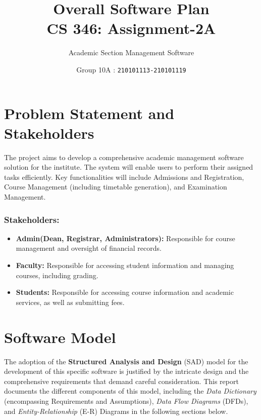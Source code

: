 \documentclass[12pt,a4paper]{article}
\begin{document}
\title{\huge \textbf{Overall Software Plan} \\ \LARGE {\textbf{CS 346: Assignment-2A}}}
\author{\Large Academic Section Management Software}
\date{Group 10A : \texttt{210101113-210101119}}
\maketitle


\section{Problem Statement and Stakeholders}
The project aims to develop a comprehensive academic management software solution for the institute. The system will enable users to perform their assigned tasks efficiently. Key functionalities will include Admissions and Registration, Course Management (including timetable generation), and Examination Management.

\subsubsection*{Stakeholders:}
\begin{itemize}
    \item \textbf{Admin(Dean, Registrar, Administrators):} Responsible for course management and oversight of financial records.
    \item \textbf{Faculty:} Responsible for accessing student information and managing courses, including grading.
    \item \textbf{Students:} Responsible for accessing course information and academic services, as well as submitting fees.
\end{itemize}

\section{Software Model}
The adoption of the \textbf{Structured Analysis and Design} (SAD) model for the development of this specific software is justified by the intricate design and the comprehensive requirements that demand careful consideration. This report documents the different components of this model, including the \textit{Data Dictionary} (encompassing Requirements and Assumptions), \textit{Data Flow Diagrams} (DFDs), and \textit{Entity-Relationship} (E-R) Diagrams in the following sections below.
    
\end{document}
